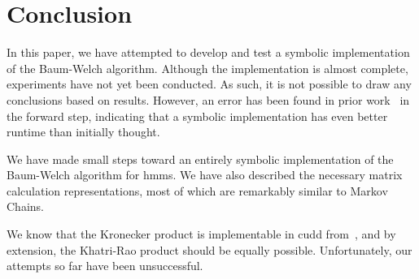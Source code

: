 % 

\section{Conclusion}\label{sec:conclusion}

In this paper, we have attempted to develop and test a symbolic implementation of the Baum-Welch algorithm.
Although the implementation is almost complete, experiments have not yet been conducted.
As such, it is not possible to draw any conclusions based on results.
However, an error has been found in prior work~\cite{p7} in the forward step, indicating that a symbolic implementation has even better runtime than initially thought.

We have made small steps toward an entirely symbolic implementation of the Baum-Welch algorithm for \glspl{hmm}.
We have also described the necessary matrix calculation representations, most of which are remarkably similar to Markov Chains.

We know that the Kronecker product is implementable in \gls{cudd} from~\cite{davidkebo-kronecker}, and by extension, the Khatri-Rao product should be equally possible.
Unfortunately, our attempts so far have been unsuccessful.